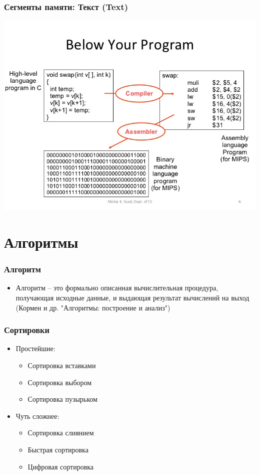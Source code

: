 \documentclass[12pt,pdf,hyperref={unicode}]{beamer}
\begin{document}
\begin{frame}[fragile]
\frametitle{Сегменты памяти: Текст (Text)} 
\includegraphics[width=0.99\linewidth]{images/c_to_byte.jpg}
\end{frame}


\section{Алгоритмы}



\begin{frame}[fragile]
\frametitle{Алгоритм} 
\begin{itemize}
\item Алгоритм -- это формально описанная вычислительная процедура, получающая исходные данные, и выдающая результат
вычислений на выход \\
(Кормен и др. "Алгоритмы: построение и анализ")
\end{itemize}
\end{frame}


\begin{frame}[fragile]
\frametitle{Сортировки} 
\begin{itemize}
\item Простейшие:
\begin{itemize}
\item Сортировка вставками \\
\item Сортировка выбором \\
\item Сортировка пузырьком \\
\end{itemize}
\item Чуть сложнее:
\begin{itemize}
\item Сортировка слиянием \\
\item Быстрая сортировка \\
\item Цифровая сортировка \\
\end{itemize}
\end{itemize}
\end{frame}
\end{document}
